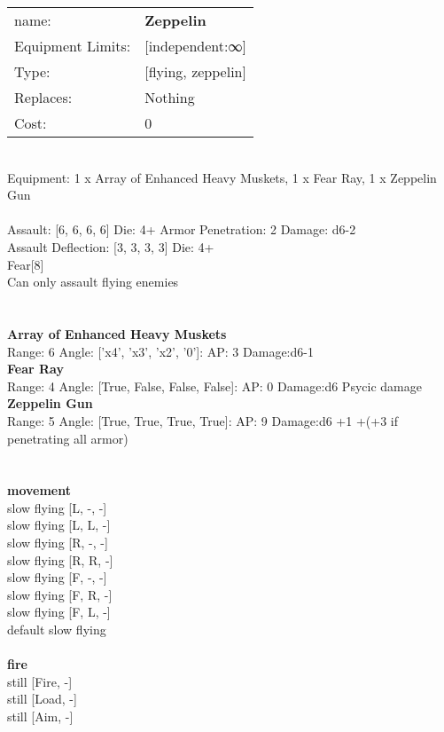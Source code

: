 \noindent
\begin{tabular}{ll}
name: &{\bf Zeppelin } \\
Equipment Limits: &[independent:∞] \\
Type: &[flying, zeppelin] \\
Replaces: &Nothing \\
Cost: & 0\\
\end{tabular}
\ \\
Equipment: 1 x Array of Enhanced Heavy Muskets, 1 x Fear Ray, 1 x Zeppelin Gun \\
\ \\
Assault: [6, 6, 6, 6] Die: 4+ Armor Penetration: 2 Damage: d6-2 \\
Assault Deflection: [3, 3, 3, 3] Die: 4+\\
\indent Fear[8]\\ 
Can only assault flying enemies\\ 
 
\ \\

\ \\
{\bf Array of Enhanced Heavy Muskets } \\



Range: 6  Angle: ['x4', 'x3', 'x2', '0']: AP: 3 Damage:d6-1 \\




{\bf Fear Ray } \\



Range: 4  Angle: [True, False, False, False]: AP: 0 Damage:d6 Psycic damage \\




{\bf Zeppelin Gun } \\



Range: 5  Angle: [True, True, True, True]: AP: 9 Damage:d6 +1 +(+3 if penetrating all armor) \\




 
\ \\



\ \\ {\bf movement } \\
slow flying [L, -, -] \\
slow flying [L, L, -] \\
slow flying [R, -, -] \\
slow flying [R, R, -] \\
slow flying [F, -, -] \\
slow flying [F, R, -] \\
slow flying [F, L, -] \\
default slow flying \\
\ \\ {\bf fire } \\
still [Fire, -] \\
still [Load, -] \\
still [Aim, -] \\


